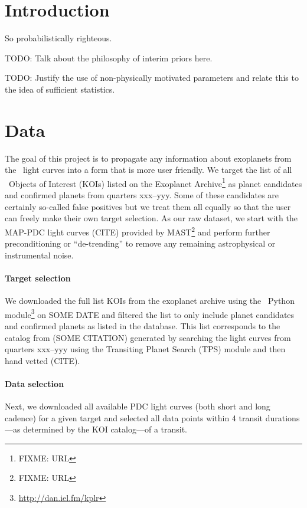 \documentclass[12pt,preprint]{aastex}
\begin{document}
\section{Introduction}

So probabilistically righteous.

TODO: Talk about the philosophy of interim priors here.

TODO: Justify the use of non-physically motivated parameters and relate this
to the idea of sufficient statistics.

\section{Data}

The goal of this project is to propagate any information about exoplanets from
the \kepler\ light curves into a form that is more user friendly.
We target the list of all \kepler\ Objects of Interest (KOIs) listed on the
Exoplanet Archive\footnote{FIXME: URL} as planet candidates and confirmed
planets from quarters xxx--yyy.
Some of these candidates are certainly so-called false positives but we treat
them all equally so that the user can freely make their own target selection.
As our raw dataset, we start with the MAP-PDC light curves (CITE) provided by
MAST\footnote{FIXME: URL} and perform further preconditioning or
``de-trending'' to remove any remaining astrophysical or instrumental noise.

\paragraph{Target selection}
We downloaded the full list KOIs from the exoplanet archive using the \kplr\
Python module\footnote{\url{http://dan.iel.fm/kplr}} on SOME DATE and filtered
the list to only include planet candidates and confirmed planets as listed in
the database.
This list corresponds to the catalog from (SOME CITATION) generated by
searching the light curves from quarters xxx--yyy using the Transiting Planet
Search (TPS) module and then hand vetted (CITE).

\paragraph{Data selection}
Next, we downloaded all available PDC light curves (both short and long
cadence) for a given target and selected all data points within 4 transit
durations---as determined by the KOI catalog---of a transit.
\end{document}
